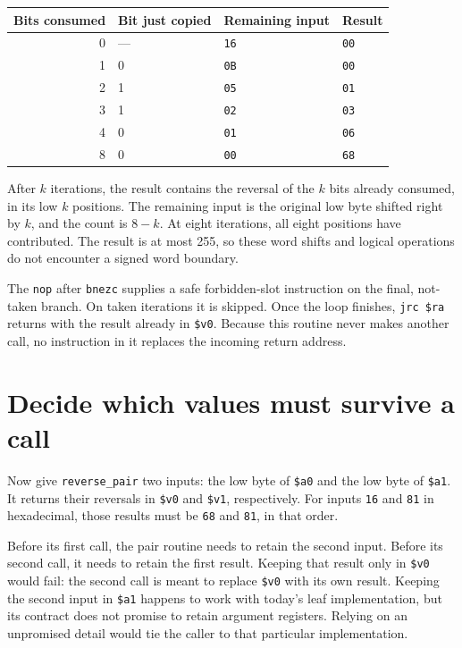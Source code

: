 \begin{center}
  \begin{tabular}{rlll}
    \toprule
    Bits consumed & Bit just copied & Remaining input & Result      \\
    \midrule
    0             & ---             & \texttt{16}     & \texttt{00} \\
    1             & 0               & \texttt{0B}     & \texttt{00} \\
    2             & 1               & \texttt{05}     & \texttt{01} \\
    3             & 1               & \texttt{02}     & \texttt{03} \\
    4             & 0               & \texttt{01}     & \texttt{06} \\
    8             & 0               & \texttt{00}     & \texttt{68} \\
    \bottomrule
  \end{tabular}
\end{center}

After $k$ iterations, the result contains the reversal of the $k$ bits already
consumed, in its low $k$ positions. The remaining input is the original low byte
shifted right by $k$, and the count is $8-k$. At eight iterations, all eight
positions have contributed. The result is at most 255, so these word shifts and
logical operations do not encounter a signed word boundary.

The \texttt{nop} after \texttt{bnezc} supplies a safe forbidden-slot instruction
on the final, not-taken branch. On taken iterations it is skipped. Once the loop
finishes, \texttt{jrc \$ra} returns with the result already in \texttt{\$v0}.
Because this routine never makes another call, no instruction in it replaces the
incoming return address.

\section{Decide which values must survive a call}

Now give \texttt{reverse\_pair} two inputs: the low byte of \texttt{\$a0} and the
low byte of \texttt{\$a1}. It returns their reversals in \texttt{\$v0} and
\texttt{\$v1}, respectively. For inputs \texttt{16} and \texttt{81} in
hexadecimal, those results must be \texttt{68} and \texttt{81}, in that order.

Before its first call, the pair routine needs to retain the second input. Before
its second call, it needs to retain the first result. Keeping that result only in
\texttt{\$v0} would fail: the second call is meant to replace \texttt{\$v0} with
its own result. Keeping the second input in \texttt{\$a1} happens to work with
today's leaf implementation, but its contract does not promise to retain argument
registers. Relying on an unpromised detail would tie the caller to that particular
implementation.

